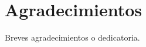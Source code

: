 \documentclass[12pt,twoside,titlepage]{report}
\newcommand{\nombreautor}{Aarón Salinero Valencia}
\newcommand{\nombretutor}{Nicolás Rodríguez Uribe}
\newcommand{\titulotrabajo}{Aplicación web de finanzas para tienda de muebles}
\newcommand{\escuelalargo}{Escuela Técnica Superior de Ingeniería Informática}
\newcommand{\universidad}{Universidad Rey Juan Carlos}
\newcommand{\fecha}{Fecha}
\newcommand\blankpage{%
    \newpage
    \null
    \thispagestyle{empty}%
    \newpage}
\begin{document}








\hypersetup{pageanchor=true}

\normalsize
\afterpage{\blankpage} %






\setlength{\parskip}{0.75em}
\renewcommand{\baselinestretch}{1.25}

\setcounter{page}{2}



\chapter*{Agradecimientos}

Breves agradecimientos o dedicatoria.

\afterpage{\blankpage}
\end{document}
